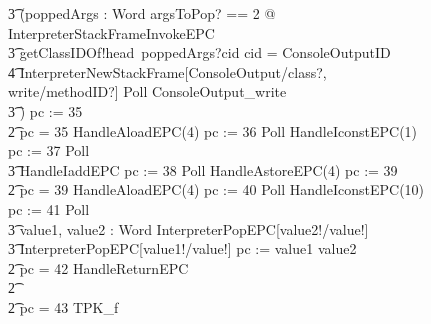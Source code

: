 \begin{figure}[tp!]
{\begin{circus}
    \t3 (\circvar poppedArgs : Word \circspot \lschexpract \exists argsToPop? == 2 @ InterpreterStackFrameInvokeEPC \rschexpract \circseq \\
    \t3 getClassIDOf!head~poppedArgs?cid \then \circif cid = ConsoleOutputID \circthen {} \\
    \t4 \lschexpract InterpreterNewStackFrame[ConsoleOutput/class?, write/methodID?] \rschexpract \circseq  Poll \circseq ConsoleOutput\_write \\
    \t3 \circfi) \circseq pc := 35 \\
    \t2 {} \circelse pc = 35 \circthen HandleAloadEPC(4) \circseq pc := 36 \circseq Poll \circseq HandleIconstEPC(1) \circseq pc := 37 \circseq Poll \circseq \\
    \t3 HandleIaddEPC \circseq pc := 38 \circseq Poll \circseq HandleAstoreEPC(4) \circseq pc := 39 \\
    \t2 {} \circelse pc = 39 \circthen HandleAloadEPC(4) \circseq pc := 40 \circseq Poll \circseq HandleIconstEPC(10) \circseq  pc := 41 \circseq Poll \circseq \\
    \t3 \circvar value1, value2 : Word \circspot \lschexpract InterpreterPopEPC[value2!/value!] \rschexpract \circseq \\
    \t3 \lschexpract InterpreterPopEPC[value1!/value!] \rschexpract \circseq pc := \IF value1 \leq value2   \\
    \t2 {} \circelse pc = 42 \circthen HandleReturnEPC \\
    \t2 {} \cdots {} \\
    \t2 {} \circelse pc = 43 \circthen TPK\_f \\

\end{circus}}
\end{figure}
